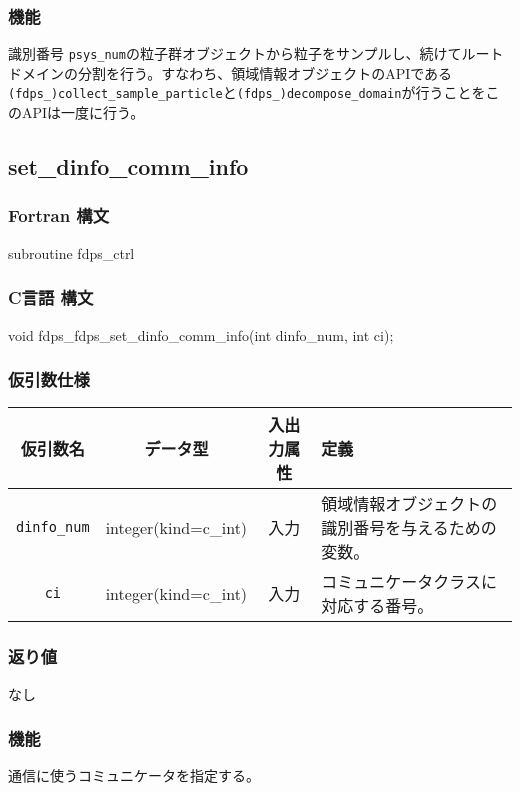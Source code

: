 \subsubsection*{機能}
識別番号 \texttt{psys\_num}の粒子群オブジェクトから粒子をサンプルし、続けてルートドメインの分割を行う。すなわち、領域情報オブジェクトのAPIである\texttt{(fdps\_)collect\_sample\_particle}と\texttt{(fdps\_)decompose\_domain}が行うことをこのAPIは一度に行う。

\subsection{set\_dinfo\_comm\_info}
\subsubsection*{Fortran 構文}
\begin{screen}
\begin{spverbatim}
subroutine fdps_ctrl%
\end{spverbatim}
\end{screen}

\subsubsection*{C言語 構文}
\begin{screen}
\begin{spverbatim}
void fdps_fdps_set_dinfo_comm_info(int dinfo_num,
                                   int ci);
\end{spverbatim}
\end{screen}



\subsubsection*{仮引数仕様}
\begin{table}[h]
\begin{tabularx}{\linewidth}{cccX}
\toprule
\rowcolor{Snow2}
仮引数名 & データ型 & 入出力属性 & 定義 \\
\midrule
\texttt{dinfo\_num} & integer(kind=c\_int) & 入力 & 領域情報オブジェクトの識別番号を与えるための変数。\\
\texttt{ci} & integer(kind=c\_int) & 入力 & コミュニケータクラスに対応する番号。\\
\bottomrule
\end{tabularx}
\end{table}

\subsubsection*{返り値}
なし

\subsubsection*{機能}

通信に使うコミュニケータを指定する。 

\clearpage

